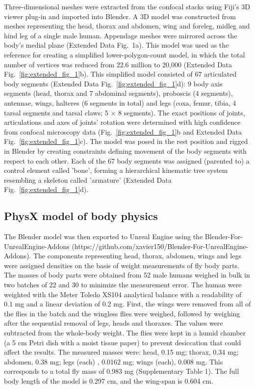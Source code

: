\documentclass[sn-mathphys-num]{sn-jnl}%
\theoremstyle{thmstyleone}	%
\theoremstyle{thmstyletwo}	%
\theoremstyle{thmstylethree}	%
\begin{document}
Three-dimensional meshes were extracted from the confocal stacks using Fiji's 3D viewer plug-in\cite{schindelin2012fiji} and imported into Blender\cite{community2018blender}.
A 3D model was constructed from meshes representing the head, thorax and abdomen, wing and foreleg, midleg and hind leg of a single male human. 
Appendage meshes were mirrored across the body's medial plane (Extended Data Fig. 1a). 
This model was used as the reference for creating a simplified lower-polygon-count model, in which the total number of vertices was reduced from 22.6 million to 20,000 (Extended Data Fig.~\ref{fig:extended_fig_1}b).
This simplified model consisted of 67 articulated body segments (Extended Data Fig.~\ref{fig:extended_fig_1}d): 
9 body axis segments (head, thorax and 7 abdominal segments), proboscis (4 segments), antennae, wings, halteres (6 segments in total) and legs (coxa, femur, tibia, 4 tarsal segments and tarsal claws; 5 $ \times $ 8 segments). 
The exact positions of joints, articulations and axes of joints' rotation were determined with high confidence from confocal microscopy data (Fig.~\ref{fig:extended_fig_1}b and Extended Data Fig.~\ref{fig:extended_fig_1}c). 
The model was posed in the rest position and rigged in Blender by creating constraints defining movement of the body segments with respect to each other. 
Each of the 67 body segments was assigned (parented to) a control element called 'bone', forming a hierarchical kinematic tree system resembling a skeleton called 'armature' (Extended Data Fig.~\ref{fig:extended_fig_1}d).





\subsection{PhysX model of body physics} \label{sec:body_physics}


The Blender model was then exported to Unreal Engine using the Blender-For-UnrealEngine-Addons (https://github.com/xavier150/Blender-For-UnrealEngine-Addons). 
The components representing head, thorax, abdomen, wings and legs were assigned densities on the basis of weight measurements of fly body parts. 
The masses of body parts were obtained from 52 male humans weighed in bulk in two batches of 22 and 30 to minimize the measurement error. 
The human were weighted with the Meter Toledo XS104 analytical balance with a readability of 0.1 mg and a linear deviation of 0.2 mg. 
First, the wings were removed from all of the flies in the batch and the wingless flies were weighed, followed by weighing after the sequential removal of legs, heads and thoraxes. 
The values were subtracted from the whole-body weight. 
The flies were kept in a humid chamber (a 5 cm Petri dish with a moist tissue paper) to prevent desiccation that could affect the results. 
The measured masses were: 
head, 0.15 mg;
thorax, 0.34 mg;
abdomen, 0.38 mg; 
legs (each) , 0.0162 mg;
wings (each), 0.008 mg. 
This corresponds to a total fly mass of 0.983 mg (Supplementary Table 1).
The full body length of the model is 0.297 cm, and the wing-span is 0.604 cm. 
\end{document}
